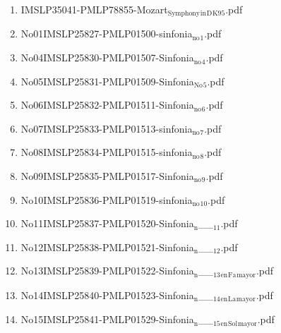 \documentclass[11pt]{article}
\begin{document}
\begin{enumerate}
\begin{enumerate}
\item IMSLP35041-PMLP78855-Mozart$_{\text{Symphony}}$$_{\text{in}}$$_{\text{D}}$$_{\text{K95}}$.pdf
\label{sec-1-1-1-1-44-49-11-43}

\item No01IMSLP25827-PMLP01500-sinfonia$_{\text{no}}$$_{\text{1}}$.pdf
\label{sec-1-1-1-1-44-49-11-44}

\item No04IMSLP25830-PMLP01507-Sinfonia$_{\text{no}}$$_{\text{4}}$.pdf
\label{sec-1-1-1-1-44-49-11-45}

\item No05IMSLP25831-PMLP01509-Sinfonia$_{\text{No}}$$_{\text{5}}$.pdf
\label{sec-1-1-1-1-44-49-11-46}

\item No06IMSLP25832-PMLP01511-Sinfonia$_{\text{no}}$$_{\text{6}}$.pdf
\label{sec-1-1-1-1-44-49-11-47}

\item No07IMSLP25833-PMLP01513-sinfonia$_{\text{no}}$$_{\text{7}}$.pdf
\label{sec-1-1-1-1-44-49-11-48}

\item No08IMSLP25834-PMLP01515-sinfonia$_{\text{no}}$$_{\text{8}}$.pdf
\label{sec-1-1-1-1-44-49-11-49}

\item No09IMSLP25835-PMLP01517-Sinfonia$_{\text{no}}$$_{\text{9}}$.pdf
\label{sec-1-1-1-1-44-49-11-50}

\item No10IMSLP25836-PMLP01519-sinfonia$_{\text{no}}$$_{\text{10}}$.pdf
\label{sec-1-1-1-1-44-49-11-51}

\item No11IMSLP25837-PMLP01520-Sinfonia$_{\text{n}}$\_\_$_{\text{11}}$.pdf
\label{sec-1-1-1-1-44-49-11-52}

\item No12IMSLP25838-PMLP01521-Sinfonia$_{\text{n}}$\_\_$_{\text{12}}$.pdf
\label{sec-1-1-1-1-44-49-11-53}

\item No13IMSLP25839-PMLP01522-Sinfonia$_{\text{n}}$\_\_$_{\text{13}}$$_{\text{en}}$$_{\text{Fa}}$$_{\text{mayor}}$.pdf
\label{sec-1-1-1-1-44-49-11-54}

\item No14IMSLP25840-PMLP01523-Sinfonia$_{\text{n}}$\_\_$_{\text{14}}$$_{\text{en}}$$_{\text{La}}$$_{\text{mayor}}$.pdf
\label{sec-1-1-1-1-44-49-11-55}

\item No15IMSLP25841-PMLP01529-Sinfonia$_{\text{n}}$\_\_$_{\text{15}}$$_{\text{en}}$$_{\text{Sol}}$$_{\text{mayor}}$.pdf
\label{sec-1-1-1-1-44-49-11-56}


\end{enumerate}
\end{enumerate}
\end{document}
